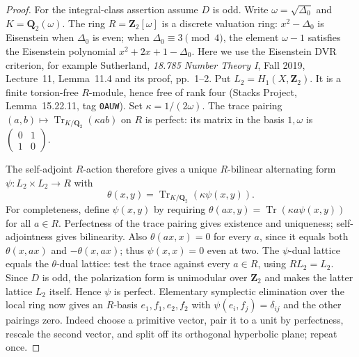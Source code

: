 \documentclass[11pt,a4paper]{article}
\theoremstyle{definition}
\begin{document}
\begin{proof}
For the integral-class assertion assume $D$ is odd.
Write $\omega=\sqrt{\Delta_0}$ and $K=\mathbf Q_2(\omega)$.
The ring $R=\mathbf Z_2[\omega]$ is a discrete valuation
ring: $x^2-\Delta_0$ is Eisenstein when $\Delta_0$ is even;
when $\Delta_0\equiv3\pmod4$, the element $\omega-1$
satisfies the Eisenstein polynomial
$x^2+2x+1-\Delta_0$.
Here we use the Eisenstein DVR criterion, for example
Sutherland, \emph{18.785 Number Theory I}, Fall 2019,
Lecture~11, Lemma~11.4 and its proof, pp.~1--2.
Put $L_2=H_1(X,\mathbf Z_2)$.
It is a finite torsion-free $R$-module, hence free of
rank four (Stacks Project, Lemma~15.22.11,
tag \texttt{0AUW}).
Set $\kappa=1/(2\omega)$.
The trace pairing $(a,b)\mapsto\operatorname{Tr}_{K/\mathbf Q_2}
(\kappa ab)$ on $R$ is perfect: its matrix in the basis
$1,\omega$ is
$\left(\begin{smallmatrix}0&1\\1&0\end{smallmatrix}\right)$.

The self-adjoint $R$-action therefore gives a unique
$R$-bilinear alternating form $\psi:L_2\times L_2\to R$
with
\[
 \theta(x,y)=\operatorname{Tr}_{K/\mathbf Q_2}
                         (\kappa\psi(x,y)).
 \tag{S32.2}
\]
For completeness, define $\psi(x,y)$ by requiring
$\theta(ax,y)=\operatorname{Tr}(\kappa a\psi(x,y))$
for all $a\in R$. Perfectness of the trace pairing gives
existence and uniqueness; self-adjointness gives
bilinearity. Also $\theta(ax,x)=0$ for every $a$, since
it equals both $\theta(x,ax)$ and $-\theta(x,ax)$;
thus $\psi(x,x)=0$ even at two.
The $\psi$-dual lattice equals the $\theta$-dual lattice:
test the trace against every $a\in R$, using $RL_2=L_2$.
Since $D$ is odd, the polarization form is unimodular
over $\mathbf Z_2$ and makes the latter lattice
$L_2$ itself. Hence $\psi$ is perfect.
Elementary symplectic elimination over the local ring
now gives an $R$-basis $e_1,f_1,e_2,f_2$ with
$\psi(e_i,f_j)=\delta_{ij}$ and the other pairings zero.
Indeed choose a primitive vector, pair it to a unit by
perfectness, rescale the second vector, and split off
its orthogonal hyperbolic plane; repeat once.


\end{proof}
\end{document}
